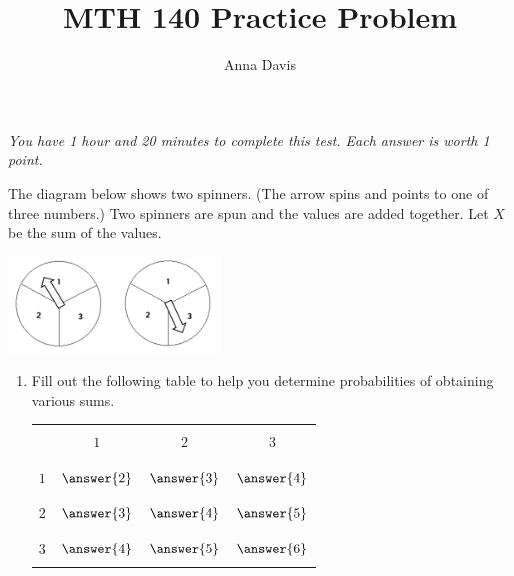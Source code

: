 \documentclass{ximera}
\author{Anna Davis} \title{MTH 140 Practice Problem}
\begin{document}
\begin{abstract}

\end{abstract}
\maketitle
 \textit{You have 1 hour and 20 minutes to complete this test.  Each answer is worth 1 point.}
\begin{problem}\label{prob:test2prob1}
The diagram below shows two spinners.  (The arrow spins and points to one of three numbers.)  Two spinners are spun and the values are added together.  Let $X$ be the sum of the values.  

\begin{image}
   
\includegraphics[height=1in]{test2pic1.jpg}~
 
\end{image}



\begin{enumerate}
    \item Fill out the following table to help you determine probabilities of obtaining various sums.
    
\begin{center}
\begin{tabular}{|c|c|c|c|}
 \hline
 && &   \\
 & $1$& $2$ &$3$ \\
 && &   \\
  \hline
  && & \\
 $1$&$\answer{2}$&$\answer{3}$&$\answer{4}$ \\
  &&& \\
 \hline
  &&& \\
 $2$&$\answer{3}$&$\answer{4}$ &$\answer{5}$ \\
  &&& \\
 \hline
  &&& \\
  $3$&$\answer{4}$&$\answer{5}$  &$\answer{6}$ \\
  &&& \\
 \hline
 \end{tabular}
\end{center}    
    

\end{enumerate}
\end{problem}
\end{document}
